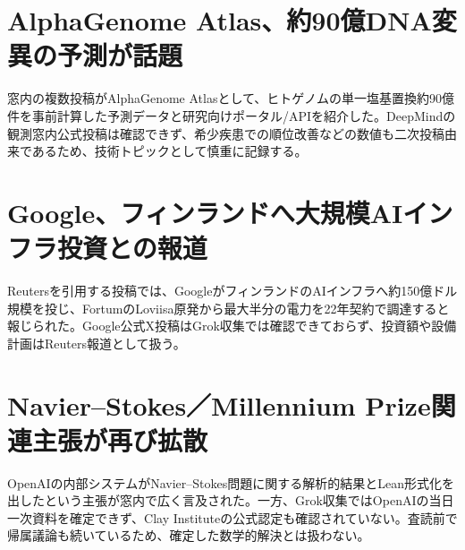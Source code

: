 \section{AlphaGenome Atlas、約90億DNA変異の予測が話題}
窓内の複数投稿がAlphaGenome Atlasとして、ヒトゲノムの単一塩基置換約90億件を事前計算した予測データと研究向けポータル/APIを紹介した。DeepMindの観測窓内公式投稿は確認できず、希少疾患での順位改善などの数値も二次投稿由来であるため、技術トピックとして慎重に記録する。

\section{Google、フィンランドへ大規模AIインフラ投資との報道}
Reutersを引用する投稿では、GoogleがフィンランドのAIインフラへ約150億ドル規模を投じ、FortumのLoviisa原発から最大半分の電力を22年契約で調達すると報じられた。Google公式X投稿はGrok収集では確認できておらず、投資額や設備計画はReuters報道として扱う。

\section{Navier--Stokes／Millennium Prize関連主張が再び拡散}
OpenAIの内部システムがNavier--Stokes問題に関する解析的結果とLean形式化を出したという主張が窓内で広く言及された。一方、Grok収集ではOpenAIの当日一次資料を確定できず、Clay Instituteの公式認定も確認されていない。査読前で帰属議論も続いているため、確定した数学的解決とは扱わない。
